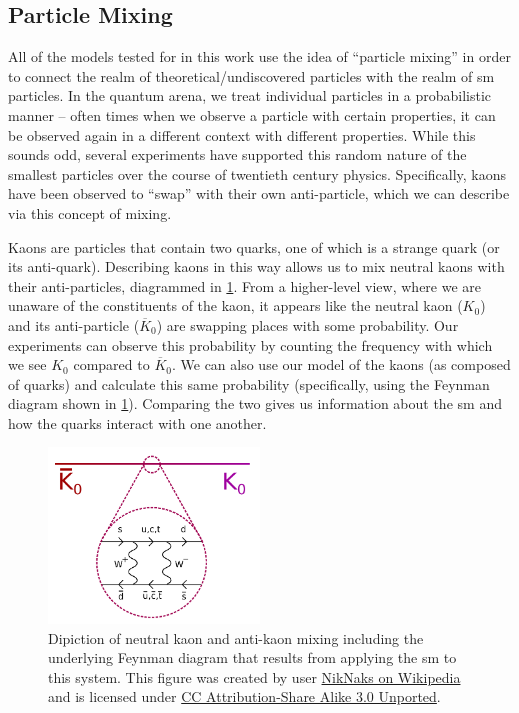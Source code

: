 \subsection{Particle Mixing}
All of the models tested for in this work use the idea of ``particle mixing'' in order
to connect the realm of theoretical/undiscovered particles with the realm of \ac{sm}
particles. In the quantum arena, we treat individual particles in a probabilistic
manner -- often times when we observe a particle with certain properties, it can
be observed again in a different context with different properties.
While this sounds odd, several experiments have supported this random nature
of the smallest particles over the course of twentieth century physics.
Specifically, kaons have been observed to ``swap'' with their own anti-particle,
which we can describe via this concept of mixing.

Kaons are particles that contain two quarks, one of which is a strange quark (or its
anti-quark). Describing kaons in this way allows us to mix neutral kaons with their
anti-particles, diagrammed in \cref{fig:kaon-box-diagram}. From a higher-level view,
where we are unaware of the constituents of the kaon, it appears like the neutral kaon (\(K_0\))
and its anti-particle (\(\overline{K}_0\)) are swapping places with some probability.
Our experiments can observe this probability by counting the frequency with which we
see \(K_0\) compared to \(\overline{K}_0\).
We can also use our model of the kaons (as composed of quarks) and calculate this
same probability (specifically, using the Feynman diagram shown in \cref{fig:kaon-box-diagram}).
Comparing the two gives us information about the \ac{sm} and how the quarks
interact with one another.

\begin{figure}
	\centering
	\includegraphics[width=0.5\textwidth]{figures/intro/Kaon-box-diagram-with-bar.pdf}
	\caption{
		Dipiction of neutral kaon and anti-kaon mixing including the underlying
		Feynman diagram that results from applying the \ac{sm} to this system.
		This figure was created by user
		\href{https://commons.wikimedia.org/wiki/File:Kaon-box-diagram-with-bar.svg}{NikNaks on Wikipedia}
		and is licensed under
		\href{https://creativecommons.org/licenses/by-sa/3.0/deed.en}{CC Attribution-Share Alike 3.0 Unported}.
	}
	\label{fig:kaon-box-diagram}
\end{figure}

